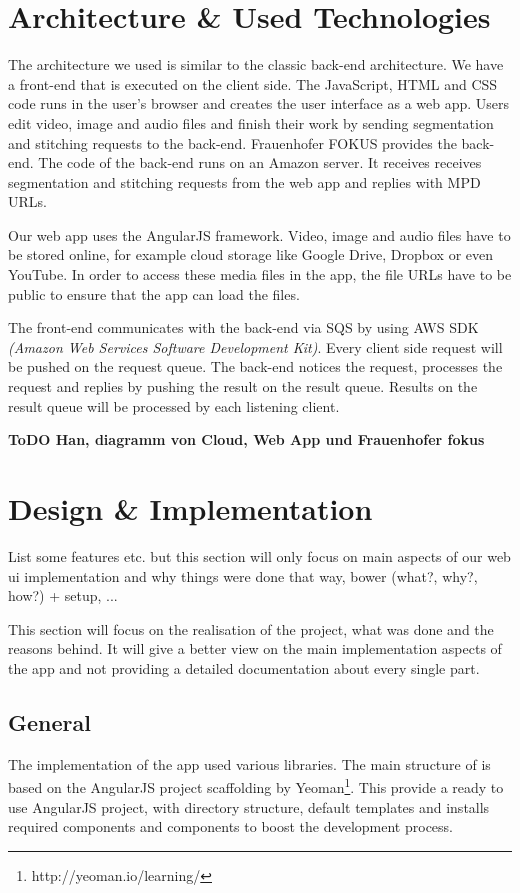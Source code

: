 \documentclass[conference]{IEEEtran}
\begin{document}
\section{Architecture \& Used Technologies}
The architecture we used is similar to the classic back-end architecture.
We have a front-end that is executed on the client side.
The JavaScript, HTML and CSS code runs in the user's browser and creates the user interface as a web app.
Users edit video, image and audio files and finish their work by sending segmentation and stitching requests to the back-end.
Frauenhofer FOKUS provides the back-end.
The code of the back-end runs on an Amazon server.
It receives receives segmentation and stitching requests from the web app and replies with MPD URLs.

Our web app uses the AngularJS framework.
Video, image and audio files have to be stored online, for example cloud storage like Google Drive, Dropbox or even YouTube.
In order to access these media files in the app, the file URLs have to be public to ensure that the app can load the files.

The front-end communicates with the back-end via SQS by using AWS SDK \textit{(Amazon Web Services Software Development Kit)}.
Every client side request will be pushed on the request queue.
The back-end notices the request, processes the request and replies by pushing the result on the result queue.
Results on the result queue will be processed by each listening client.

\textbf{ToDO Han, diagramm von Cloud, Web App und Frauenhofer fokus}

\section{Design \& Implementation}
List some features etc. but this section will only focus on main aspects of our web ui implementation and why things were done that way, bower (what?, why?, how?) + setup, ...

This section will focus on the realisation of the project, what was done and the reasons behind. It will give a better view on the main implementation aspects of the app and not providing a detailed documentation about every single part.

\subsection{General}
The implementation of the app used various libraries. The main structure of is based on the AngularJS project scaffolding by Yeoman\footnote{http://yeoman.io/learning/}. This provide a ready to use AngularJS project, with directory structure, default templates and installs required components and components to boost the development process. 
\end{document}
